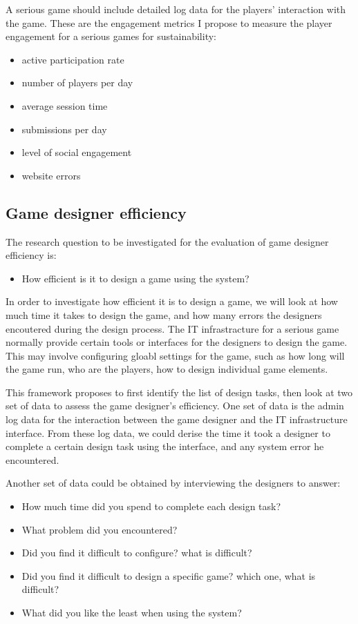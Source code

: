 A serious game should include detailed log data for the players' interaction with the game.
These are the engagement metrics I propose to measure the player engagement for a serious games for sustainability:

\begin{itemize}
\item active participation rate
\item number of players per day
\item average session time
\item submissions per day
\item level of social engagement
\item website errors
\end{itemize}

\subsection{Game designer efficiency}
The research question to be investigated for the evaluation of game designer efficiency is:
\begin{itemize}
\item How efficient is it to design a game using the system?
\end{itemize}

In order to investigate how efficient it is to design a game, we will look at how much time it takes to design the game, and how many errors the designers encoutered during the design process.
The IT infrastracture for a serious game normally provide certain tools or interfaces for the designers to design the game. This may involve configuring gloabl settings for the game, such as how long will the game run, who are the players, how to design individual game elements.

This framework proposes to first identify the list of design tasks, then look at two set of data to assess the game designer's efficiency. One set of data is the admin log data for the interaction between the game designer and the IT infrastructure interface. From these log data, we could derise the time it took a designer to complete a certain design task using the interface, and any system error he encountered.

Another set of data could be obtained by interviewing the designers to answer:
\begin{itemize}
    \item How much time did you spend to complete each design task?
    \item What problem did you encountered?
    \item Did you find it difficult to configure? what is difficult?
    \item Did you find it difficult to design a specific game? which one, what is difficult?
    \item What did you like the least when using the system?
\end{itemize}

